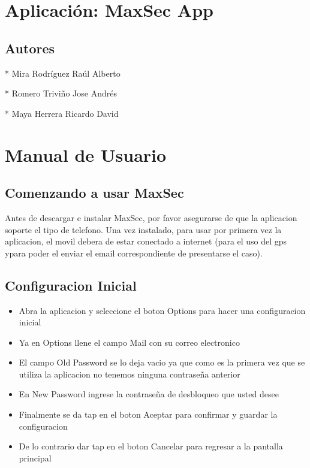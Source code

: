 \documentclass[12pt,letterpaper]{article}
\begin{document}
\section{Aplicación: MaxSec App}
\subsection{Autores}

* Mira Rodríguez Raúl Alberto

* Romero Triviño Jose Andrés

* Maya Herrera Ricardo David

\section{Manual de Usuario}
\subsection{Comenzando a usar MaxSec}

Antes de descargar e instalar MaxSec, por favor asegurarse de que la aplicacion soporte el tipo de telefono.
Una vez instalado, para usar por primera vez la aplicacion, el movil debera de estar conectado a internet (para el uso del gps ypara poder el enviar el email correspondiente de presentarse el caso).

\subsection{Configuracion Inicial}

 \begin{itemize}

\item{Abra la aplicacion y seleccione el boton Options para hacer una configuracion inicial}

\item{Ya en Options llene el campo Mail con su correo electronico}

\item{El campo Old Password se lo deja vacio ya que como es la primera vez que se utiliza la aplicacion no tenemos ninguna contraseña anterior}

\item{En New Password ingrese la contraseña de desbloqueo que usted desee}

\item{Finalmente se da tap en el boton Aceptar para confirmar y guardar la configuracion}

\item{De lo contrario dar tap en el boton Cancelar para regresar a la pantalla principal}

\end{itemize}
\end{document}
